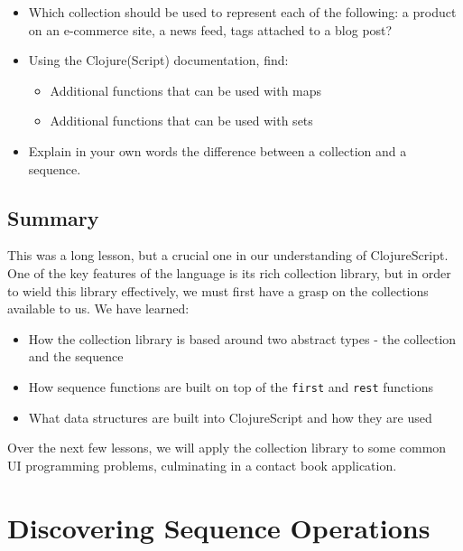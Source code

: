 \documentclass[10pt,twoside,openright]{memoir}
\begin{document}
\begin{itemize}
\tightlist
\item
  Which collection should be used to represent each of the following: a
  product on an e-commerce site, a news feed, tags attached to a blog
  post?
\item
  Using the Clojure(Script) documentation, find:

  \begin{itemize}
  \tightlist
  \item
    Additional functions that can be used with maps
  \item
    Additional functions that can be used with sets
  \end{itemize}
\item
  Explain in your own words the difference between a collection and a
  sequence.
\end{itemize}


\section{Summary}

This was a long lesson, but a crucial one in our understanding of
ClojureScript. One of the key features of the language is its rich
collection library, but in order to wield this library effectively, we
must first have a grasp on the collections available to us. We have
learned:

\begin{itemize}
\tightlist
\item
  How the collection library is based around two abstract types - the
  collection and the sequence
\item
  How sequence functions are built on top of the \texttt{first} and
  \texttt{rest} functions
\item
  What data structures are built into ClojureScript and how they are
  used
\end{itemize}

Over the next few lessons, we will apply the collection library to some
common UI programming problems, culminating in a contact book
application.

\chapter{Discovering Sequence Operations}
\end{document}
